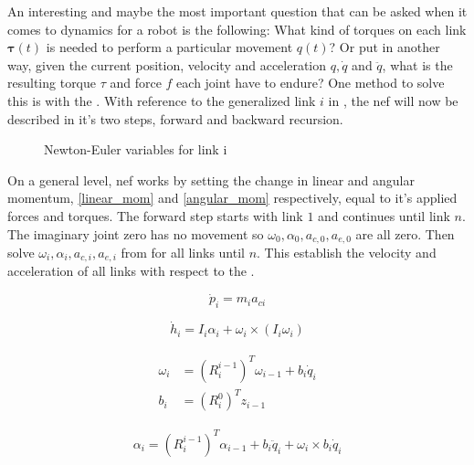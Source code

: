 An interesting and maybe the most important question that can be asked when it comes to dynamics for a robot is the following: What kind of torques on each link $\mathbf{\tau}(t)$ is needed to perform a particular movement $q(t)$? Or put in another way, given the current position, velocity and acceleration $q, \dot{q}$ and $\ddot{q}$, what is the resulting torque $\tau$ and force $f$ each joint have to endure? One method to solve this is with the . With reference to the generalized link $i$ in , the  \gls{nef} will now be described in it's two steps, forward and backward recursion.

\begin{figure}[h!]    
    \centering           
    \def\svgwidth{\columnwidth}
    
    \caption{Newton-Euler variables for link i}
    \label{newtonEuler}
\end{figure}

On a general level, \gls{nef} works by setting the change in linear and angular momentum, \eqref{linear_mom} and \eqref{angular_mom} respectively, equal to it's applied forces and torques. The forward step starts with link $1$ and continues until link $n$. The imaginary joint zero has no movement so $\omega_0, \alpha_0, a_{c,0}, a_{e,0}$ are all zero. Then solve $\omega_i, \alpha_i, a_{c,i}, a_{e,i}$ from  for all links until $n$. This establish the velocity and acceleration of all links with respect to the .

\begin{equation}\label{linear_mom}
\dot{p}_i = m_i a_{ci}
\end{equation}

\begin{equation}\label{angular_mom}
\dot{h}_i = I_i \alpha_i + \omega_i \times \left ( I_i \omega_i \right )
\end{equation}

\begin{align}\label{omega}
\begin{split}
\omega_i &= \left ( R^{i-1}_i \right )^T\omega_{i-1} + b_i\dot{q}_i\\
b_i &= \left ( R^0_i \right )^T z_{i-1}
\end{split}
\end{align}

\begin{equation}\label{alpha}
\alpha_i = \left ( R^{i-1}_i \right )^T\alpha_{i-1} + b_i\ddot{q}_i+\omega_i \times b_i\dot{q}_i
\end{equation}

